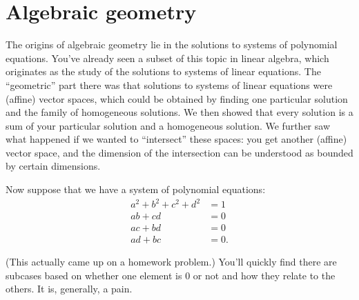 \documentclass[12pt]{article}
\begin{document}
\section{Algebraic geometry}
\label{sec:algebraic-geometry-1}

The origins of algebraic geometry lie in the solutions to systems of
polynomial equations. You've already seen a subset of this topic in
linear algebra, which originates as the study of the solutions to
systems of linear equations. The ``geometric'' part there was that
solutions to systems of linear equations were (affine) vector spaces,
which could be obtained by finding one particular solution and the
family of homogeneous solutions. We then showed that every solution is
a sum of your particular solution and a homogeneous solution. We
further saw what happened if we wanted to ``intersect'' these spaces:
you get another (affine) vector space, and the dimension of the
intersection can be understood as bounded by certain dimensions.

Now suppose that we have a system of polynomial equations:
\begin{align*}
  a^2+b^2+c^2+d^2&=1\\
                  ab+cd&=0\\
                   ac+bd&=0\\
  ad+bc&=0.
\end{align*}

(This actually came up on a homework problem.) You'll quickly find
there are subcases based on whether one element is 0 or not and how
they relate to the others. It is, generally, a pain. 
\end{document}
